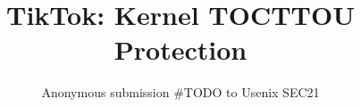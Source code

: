 \usepackage{listings}
\usepackage{parcolumns}
\usepackage{graphicx}
\usepackage{caption}
\usepackage{subcaption}
\usepackage{cleveref}

\usepackage[english]{babel}  
\addto{}
\usepackage{hyperref}

\newcommand{\uros}[1]{\textcolor{pink}{\textbf{UT:} #1}}
\newcommand{\pra}[1]{\textcolor{blue}{\textbf{PS:} #1}}
\newcommand{\nb}[1]{\textcolor{green}{\textbf{NB}: #1}}
\newcommand{\mat}[1]{\textcolor{red}{\textbf{Mat:} #1}}
\newcommand{\evalfull}[1]{20}
\newcommand{\evalnocalls}[1]{3}
\newcommand{\sysname}{TikTok}
\newcommand{\roughevaloverheadbad}{18\%}
\newcommand{\roughevaloverheadbetter}{2-4\%}




\date{}

\title{\Large \bf TikTok: Kernel TOCTTOU Protection}

\author{
Anonymous submission \#TODO to Usenix SEC21
} %

\maketitle

